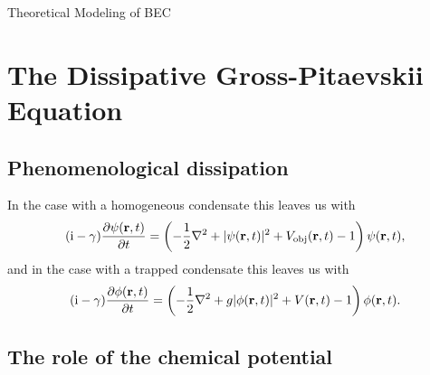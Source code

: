 \begin{chapter}{\label{cha:theoretical_model}Theoretical Modeling of BEC}
\section{\label{section:gpe} The Dissipative Gross-Pitaevskii Equation}
	\subsection{\label{section:gamma} Phenomenological dissipation}
	In the case with a homogeneous condensate this leaves us with
		\begin{equation}\label{eq:dissgpehomg}
		(\mathrm{i} - \gamma)\frac{\partial\psi({\bf r},t)}{\partial t} = \left( -\frac{1}{2}\nabla^2 + |\psi({\bf r},t)|^2 + V_{\mathrm{obj}}({\bf r},t) - 1 \right) \psi({\bf r},t),
		\end{equation}
	and in the case with a trapped condensate this leaves us with
		\begin{equation}\label{eq:dissgpetrapped}
		(\mathrm{i}-\gamma)\frac{\partial\phi({\bf r},t)}{\partial t} = \left( -\frac{1}{2}\nabla^2 + g|\phi({\bf r},t)|^2 + V({\bf r},t) - 1 \right) \phi({\bf r},t).
		\end{equation}

	\subsection{\label{section:mu} The role of the chemical potential}

\end{chapter}
